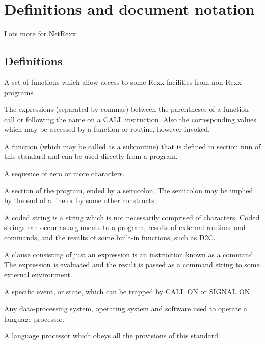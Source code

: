 \chapter{Definitions and document
notation}\label{definitions-and-document-notation}

Lots more for NetRexx

\section{Definitions}\label{definitions}

\begin{description}
\tightlist
\item[application programming interface]
A set of functions which allow access to some Rexx facilities from
non-Rexx programs.
\item[arguments]
The expressions (separated by commas) between the parentheses of a
function call or following the name on a CALL instruction. Also the
corresponding values which may be accessed by a function or routine,
however invoked.
\item[built-in function]
A function (which may be called as a subroutine) that is defined in
section nnn of this standard and can be used directly from a program.
\item[character string]
A sequence of zero or more characters.
\item[clause]
A section of the program, ended by a semicolon. The semicolon may be
implied by the end of a line or by some other constructs.
\item[coded]
A coded string is a string which is not necessarily comprised of
characters. Coded strings can occur as arguments to a program, results
of external routines and commands, and the results of some built-in
functions, such as D2C.
\item[command]
A clause consisting of just an expression is an instruction known as a
command. The expression is evaluated and the result is passed as a
command string to some external environment.
\item[condition]
A specific event, or state, which can be trapped by CALL ON or SIGNAL
ON.
\item[configuration]
Any data-processing system, operating system and software used to
operate a language processor.
\item[conforming language processor]
A language processor which obeys all the provisions of this standard.
\item[construct]

\end{description}
